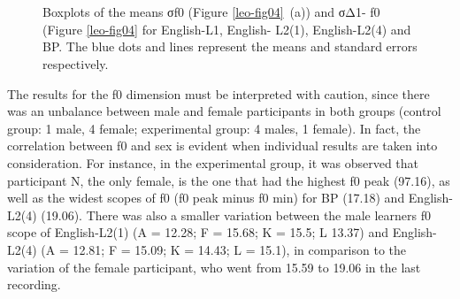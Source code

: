 \begin{figure}
\centering
{}\\
\\
\caption{Boxplots of the means σf0 (Figure \ref{leo-fig04}~(a)) and σΔ1- f0 (Figure \ref{leo-fig04} for
English-L1, English- L2(1), English-L2(4) and BP. The blue dots and lines
represent the means and standard errors respectively.}
\label{leo-fig03}
\end{figure}

The results for the f0 dimension must be interpreted with caution, since there
was an unbalance between male and female participants in both groups (control
group: 1 male, 4 female; experimental group: 4 males, 1 female). In fact, the
correlation between f0 and sex is evident when individual results are taken
into consideration. For instance, in the experimental group, it was observed
that participant N, the only female, is the one that had the highest f0 peak
(97.16), as well as the widest scopes of f0 (f0 peak minus f0 min) for BP
(17.18) and English-L2(4) (19.06). There was also a smaller variation between
the male learners f0 scope of English-L2(1) (A = 12.28; F = 15.68; K = 15.5; L
13.37) and English-L2(4) (A = 12.81; F = 15.09; K = 14.43; L = 15.1), in
comparison to the variation of the female participant, who went from 15.59 to
19.06 in the last recording. 


